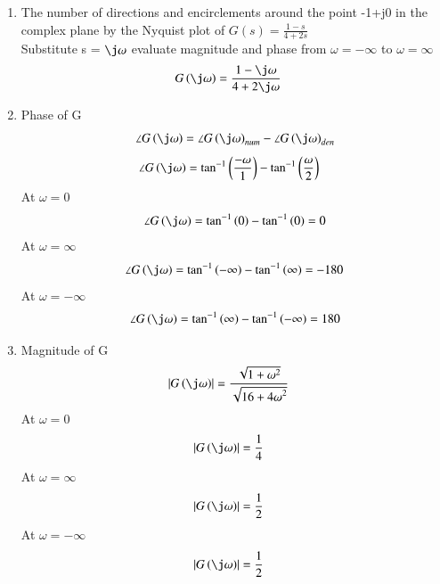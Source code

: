 \begin{enumerate}[label=\thesection.\arabic*.,ref=\thesection.\theenumi]
\item The number of directions and encirclements around the point -1+j0 in the complex plane by the Nyquist plot of $G(s) = \frac{1-s}{4+2s}$\\

\solution
Substitute s = $\j\omega$ evaluate magnitude and phase from $\omega = -\infty$ to $\omega = \infty$
\begin{align}
G\brak{\j\omega} &= \frac{1-\j\omega}{4+2\j\omega} 
\end{align}

\item Phase of G\brak{\j\omega}
\begin{align}
\angle G\brak{\j\omega} = \angle G\brak{\j\omega}_{num} - \angle G\brak{\j\omega}_{den}
\end{align}
\begin{align}
\angle G\brak{\j\omega} &= \tan^{-1}\brak{\frac{-\omega}{1}} - \tan^{-1}\brak{\frac{\omega}{2}}
\end{align}
At $\omega = 0$ 
\begin{multline}
\angle G\brak{\j\omega} = \tan^{-1}\brak{0} - \tan^{-1}\brak{0} = 0
\end{multline}
At $\omega = \infty$ 
\begin{multline}
\angle G\brak{\j\omega} = \tan^{-1}\brak{-\infty} - \tan^{-1}\brak{\infty} = -180
\end{multline}
At $\omega = -\infty$ 
\begin{multline}
\angle G\brak{\j\omega} = \tan^{-1}\brak{\infty} - \tan^{-1}\brak{-\infty} = 180
\end{multline}

\item Magnitude of G\brak{\j\omega}
\begin{align}
\abs{G\brak{\j\omega}} &= \frac{\sqrt{1+{\omega}^2}}{\sqrt{16+{4\omega}^2}} 
\end{align}
At $\omega = 0$ 
\begin{align}
    \abs{G\brak{\j\omega}} &= \frac{1}{4}
\end{align}
At $\omega = \infty$ 
\begin{align}
    \abs{G\brak{\j\omega}} &= \frac{1}{2}
\end{align}
At $\omega = -\infty$ 
\begin{align}
    \abs{G\brak{\j\omega}} &= \frac{1}{2}
\end{align}


\end{enumerate}
